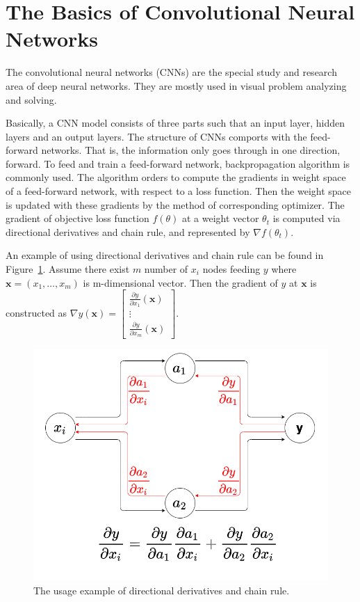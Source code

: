 \section{The Basics of Convolutional Neural Networks} \label{basics_of_cnn}

The convolutional neural networks (CNNs) are the special study and research area of deep neural networks. They are mostly used in visual problem analyzing and solving.

Basically, a CNN model consists of three parts such that an input layer, hidden layers and an output layers. The structure of CNNs comports with the feed-forward networks. That is, the information only goes through in one direction, forward. To feed and train a feed-forward network, backpropagation algorithm is commonly used. The algorithm orders to compute the gradients in weight space of a feed-forward network, with respect to a loss function. Then the weight space is updated with these gradients by the method of corresponding optimizer. The gradient of objective loss function $ f(\textbf{$\theta$}) $ at a weight vector \textbf{$\theta_{t}$} is computed via directional derivatives and chain rule, and represented by $ \nabla f(\textbf{$\theta_{t}$}) $. 

An example of using directional derivatives and chain rule can be found in Figure~\ref{fig:compute_gradient}. Assume there exist $m$ number of $x_{i}$ nodes feeding $y$ where $\textbf{x} = (x_{1}, \dots , x_{m})$ is m-dimensional vector. Then the gradient of $y$ at $\textbf{x}$ is constructed as $\nabla y (\textbf{x}) = {\begin{bmatrix}{\frac {\partial y}{\partial x_{1}}}(\textbf{x})\\\vdots \\{\frac {\partial y}{\partial x_{m}}}(\textbf{x})\end{bmatrix}}$.

\begin{figure}[h]
	\centering
	\includegraphics[width=.6\linewidth]{fig/gradient_example.png}
	\vspace*{1mm}
	\caption{The usage example of directional derivatives and chain rule.}
	\label{fig:compute_gradient}
\end{figure}

